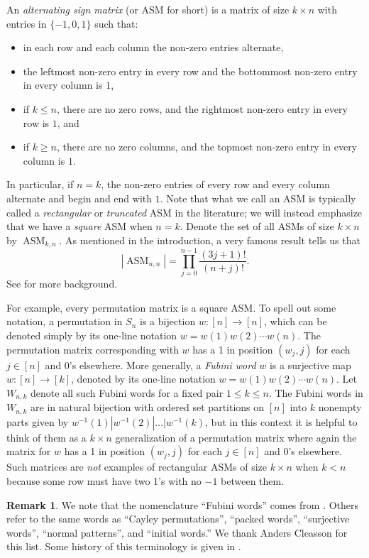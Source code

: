 \documentclass[12pt]{amsart}
\numberwithin{equation}{section}
\theoremstyle{definition}
\newtheorem{remark}[theorem]{Remark}
\newcommand{\ASM}{\operatorname{ASM}}
\begin{document}
An \emph{alternating sign matrix} (or ASM for short) is a matrix of
size $k \times n$ with entries in $\{-1,0,1\}$ such that:
\begin{itemize}
 \item in each row and each column the non-zero entries alternate,
 \item the leftmost non-zero entry in every row and the bottommost non-zero entry in every column is $1$,
 \item if $k \leq n$, there are no zero rows, and the rightmost non-zero entry in every row is $1$, and
 \item if $k \geq n$, there are no zero columns, and the topmost non-zero entry in every column is $1$.
\end{itemize}
 In particular, if $n = k$, the non-zero entries of every row and
 every column alternate and begin and end with $1$. Note that what we
 call an ASM is typically called a \emph{rectangular} or
 \emph{truncated} ASM in the literature; we will instead emphasize
 that we have a \emph{square} ASM when $n = k$. Denote the set of all
 ASMs of size $k \times n$ by $\ASM_{k,n}$. As mentioned in the
 introduction, a very famous result tells us that
 $$|\ASM_{n,n}| = \prod_{j=0}^{n-1} \frac{(3j+1)!}{(n+j)!}.$$
 See \cite{ASMs} for more background.

For example, every permutation matrix is a square ASM.  To spell out
some notation, a permutation in $S_{n}$ is a bijection $w:[n]
\longrightarrow [n]$, which can be denoted simply by its one-line
notation $w=w(1)w(2)\cdots w(n).$ The permutation matrix corresponding
with $w$ has a 1 in position $(w_{j},j)$ for each $j \in [n]$ and 0's
elsewhere.  More generally, a \textit{Fubini word} $w$ is a surjective
map $w:[n]\longrightarrow [k]$, denoted by its one-line notation
$w=w(1)w(2)\cdots w(n)$.  Let $W_{n,k}$ denote all such Fubini words
for a fixed pair $1\leq k\leq n$.  The Fubini words in $W_{n,k}$ are
in natural bijection with ordered set partitions on $[n]$ into $k$
nonempty parts given by $w^{-1}(1)|w^{-1}(2)|\dots | w^{-1}(k)$, but
in this context it is helpful to think of them as a $k \times n$
generalization of a permutation matrix where again the matrix for $w$
has a 1 in position $(w_{j},j)$ for each $j \in [n]$ and 0's elsewhere.
Such matrices are \emph{not} examples of rectangular ASMs of size $k
\times n$ when $k<n$ because some row must have two 1's with no $-1$
between them.

\begin{remark}
We note that the nomenclature ``Fubini words'' comes from
\cite[A000670]{oeis}.  Others refer to the same words as ``Cayley
permutations'', ``packed words'', ``surjective words'', ``normal
patterns'', and ``initial words.'' We thank Anders Cleasson for this
list.  Some history of this terminology is given in
\cite{claesson2024patternavoidingcayleypermutationscombinatorial}.
\end{remark}
\end{document}
